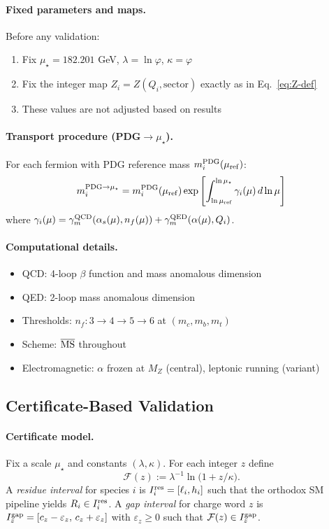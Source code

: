 \documentclass[11pt]{article}
\begin{document}
\paragraph{Fixed parameters and maps.}
Before any validation:
\begin{enumerate}
\item Fix $\mu_\star = 182.201$ GeV, $\lambda = \ln\varphi$, $\kappa = \varphi$
\item Fix the integer map $Z_i = Z(Q_i,\text{sector})$ exactly as in Eq.~\eqref{eq:Z-def}
\item These values are not adjusted based on results
\end{enumerate}

\paragraph{Transport procedure (PDG$\to\mu_\star$).}
For each fermion with PDG reference mass $m_i^{\rm PDG}(\mu_{\rm ref})$:
\begin{equation}
m_i^{\rm PDG\to\mu_\star} = m_i^{\rm PDG}(\mu_{\rm ref}) \exp\left[\int_{\ln\mu_{\rm ref}}^{\ln\mu_\star}\gamma_i(\mu)\,d\ln\mu\right]
\label{eq:transport}
\end{equation}
where $\gamma_i(\mu) = \gamma_m^{\rm QCD}(\alpha_s(\mu),n_f(\mu)) + \gamma_m^{\rm QED}(\alpha(\mu),Q_i)$.

\paragraph{Computational details.}
\begin{itemize}
\item QCD: 4-loop $\beta$ function and mass anomalous dimension
\item QED: 2-loop mass anomalous dimension  
\item Thresholds: $n_f: 3\to 4\to 5\to 6$ at $(m_c, m_b, m_t)$
\item Scheme: $\overline{\rm MS}$ throughout
\item Electromagnetic: $\alpha$ frozen at $M_Z$ (central), leptonic running (variant)
\end{itemize}

\subsection{Certificate-Based Validation}

\paragraph{Certificate model.}
Fix a scale $\mu_\star$ and constants $(\lambda,\kappa)$. For each integer $z$ define
\[
\mathcal{F}(z) := \lambda^{-1}\ln\!\bigl(1+ z/\kappa\bigr).
\]
A \emph{residue interval} for species $i$ is $I^{\rm res}_i=[\ell_i,h_i]$ such that the orthodox SM pipeline yields
$R_i \in I^{\rm res}_i$. A \emph{gap interval} for charge word $z$ is $I^{\rm gap}_z=[c_z-\varepsilon_z,\,c_z+\varepsilon_z]$
with $\varepsilon_z\ge 0$ such that $\mathcal{F}(z)\in I^{\rm gap}_z$.
\end{document}
